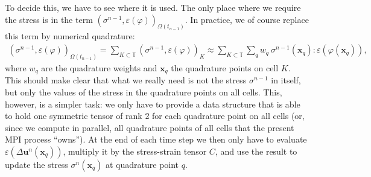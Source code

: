 \documentclass{article}
\renewcommand{\vec}[1]{\mathbf{#1}}
\begin{document}
To decide this, we have to see where it is used. The only place where we
require the stress is in the term
$(\sigma^{n-1},\varepsilon(\varphi))_{\Omega(t_{n-1})}$. In practice, we of
course replace this term by numerical quadrature:
\begin{gather}
  (\sigma^{n-1},\varepsilon(\varphi))_{\Omega(t_{n-1})}
  =
  \sum_{K\subset {\mathbb{T}}}
  (\sigma^{n-1},\varepsilon(\varphi))_K
  \approx
  \sum_{K\subset {\mathbb{T}}}
  \sum_q
  w_q \ \sigma^{n-1}(\vec x_q) : \varepsilon(\varphi(\vec x_q)),
\end{gather}
where $w_q$ are the quadrature weights and $\vec x_q$ the quadrature points on
cell $K$. This should make clear that what we really need is not the stress
$\sigma^{n-1}$ in itself, but only the values of the stress in the quadrature
points on all cells. This, however, is a simpler task: we only have to provide
a data structure that is able to hold one symmetric tensor of rank 2 for each
quadrature point on all cells (or, since we compute in parallel, all
quadrature points of all cells that the present MPI process ``owns''). At the
end of each time step we then only have to evaluate $\varepsilon(\Delta \vec
u^n(\vec x_q))$, multiply it by the stress-strain tensor $C$, and use the
result to update the stress $\sigma^n(\vec x_q)$ at quadrature point $q$.
\end{document}
